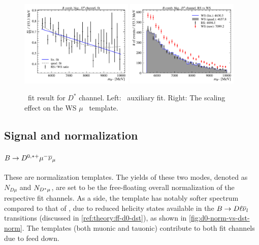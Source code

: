 \begin{figure}[!htb]
    \centering
    \includegraphics[width=0.48\textwidth]{figs-fit-fit-templates/data-driven-plots/b_comb/fit_b_comb_d0_fit.pdf}
    \includegraphics[width=0.48\textwidth]{figs-fit-fit-templates/data-driven-plots/b_comb/fit_b_comb_d0_scaled.pdf}

    \caption{
        \BComb\ fit result for $D^*$ channel.
        Left: \BComb\ auxiliary fit.
        Right: The scaling effect on the WS $\mu$ \BComb\ template.
    }
    \label{fig:b-comb-d0}
\end{figure}


\subsection{Signal and normalization}
\label{tmpl:sig-norm}

\paragraph{$B \rightarrow D^{0,*+}{\mu^-}{{\overline{\nu}}_\mu}$}
These are normalization templates.
The yields of these two modes, denoted as $N_{D\mu}$ and $N_{{{D}^*}\mu}$,
are set to be the free-floating overall normalization of the respective
fit channels.
As a side, the \Dz\muon template has notably softer \qSq spectrum compared to
that of \Dstar\muon, due to reduced helicity states available in the
$B \rightarrow D \ell {\ensuremath{{\overline{\nu}}_l}}$ transitions
(discussed in \cref{ref:theory:ff-d0-dst}),
as shown in \cref{fig:d0-norm-vs-dst-norm}.
The \Dstarp templates (both muonic and tauonic) contribute to both fit channels
due to feed down.


